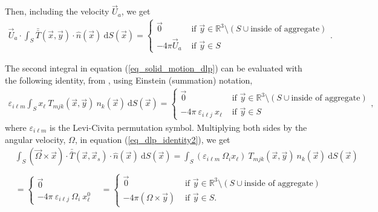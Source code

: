 Then, including the velocity $\vec{U}_a$, we get
\begin{align}
	\vec{U}_a \cdot
	\int_S  \bar{\bar{T}}(\vec{x},\vec{y}) \cdot \hat{n} ( \vec{x})
	\ \text{d}S(\vec{x})
	=
	 \begin{cases}
	 \vec{0}& \text{ if } \vec{y} \in \mathbb{R}^3  \setminus \left( S \cup {\text{inside of aggregate}}\right) 	\\ 
	 - 4\pi \vec{U}_a  & \text{ if } \vec{y} \in S 
	 \end{cases}.
	\label{eq_dlp_Ua}
\end{align}
\par 
The second integral in equation (\ref{eq_solid_motion_dlp}) can be evaluated with the following identity, from \cite{pozrikidis_boundary_1992},
using Einstein (summation) notation, 
\begin{align}
	\varepsilon_{i \ell m}
	\int_S x_{\ell} \ T_{mjk}(\vec{x},\vec{y})  \ n_{k} ( \vec{x})
	\ \text{d}S(\vec{x})
	 = 
	 \begin{cases}
	  \vec{0}
	  & \text{ if } \vec{y} \in \mathbb{R}^3  \setminus  	\left( S \cup {\text{inside of aggregate}}\right) \\ 
	 - 4\pi \ \varepsilon_{i \ell j} \ x_{\ell}
	 & \text{ if } \vec{y} \in S 
	 \end{cases},
	\label{eq_dlp_identity2}
\end{align}
where $\varepsilon_{i \ell m}$ is the Levi-Civita permutation symbol.  
Multiplying both sides by the angular velocity, $\Omega$, in equation (\ref{eq_dlp_identity2}), we get 
\begin{align}
	&
	\int_S
	\left( \vec{\Omega} \times \vec{x} \right)
	 \cdot  \bar{\bar{T}}(\vec{x},\vec{x}_s)  
	\cdot \hat{n} ( \vec{x})
	\ \text{d}S(\vec{x})
	 = 
	\int_S 
	\left(  \varepsilon_{i \ell m} \ \Omega_{i} x_{\ell} \right) \ 	T_{mjk}(\vec{x},\vec{y})  \ n_{k} ( \vec{x})
	\ \text{d}S(\vec{x})
	\nonumber \\
	\nonumber \\
 	& = 
 	\begin{cases}
 	  \vec{0}
 	 &  \\ 
 	- 4\pi \ \varepsilon_{i \ell j}\  \Omega_{i} \ x^0_{\ell}
 	& 
 	\end{cases}
	= \begin{cases}
 	  \vec{0}
 	 & \text{ if } \vec{y} \in \mathbb{R}^3  \setminus  
	 \left( S \cup {\text{inside of aggregate}}\right)
	  \\ 
 	- 4\pi \left(  \Omega \times \vec{y} \right)
 	& \text{ if } \vec{y} \in S.
 	\end{cases}
	\label{eq_dlp_Omega}
\end{align}
